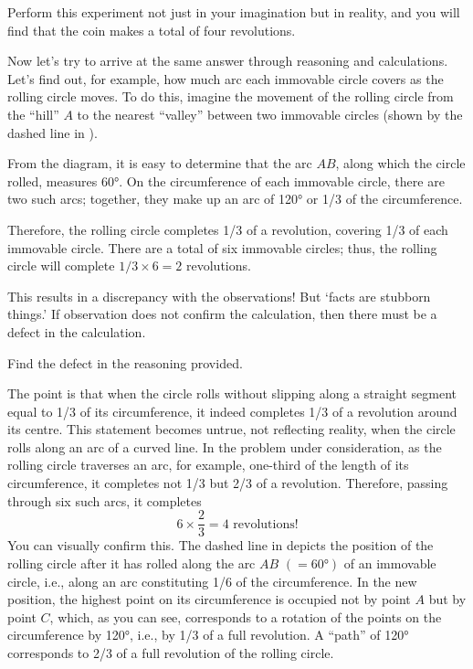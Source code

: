 Perform this experiment not just in your imagination but in reality, and you will find that the coin makes a total of four revolutions.

Now let's try to arrive at the same answer through reasoning and calculations. Let's find out, for example, how much arc each immovable circle covers as the rolling circle moves. To do this, imagine the movement of the rolling circle from the ``hill'' $A$ to the nearest ``valley'' between two immovable circles (shown by the dashed line in ).

From the diagram, it is easy to determine that the arc $AB$, along which the circle rolled, measures \ang{60}. On the circumference of each immovable circle, there are two such arcs; together, they make up an arc of \ang{120} or 1/3 of the circumference.

Therefore, the rolling circle completes 1/3 of a revolution, covering 1/3 of each immovable circle. There are a total of six immovable circles; thus, the rolling circle will complete $1/3 \times 6 = 2$ revolutions.

This results in a discrepancy with the observations! But `facts are stubborn things.' If observation does not confirm the calculation, then there must be a defect in the calculation.

Find the defect in the reasoning provided.

\ans  The point is that when the circle rolls without slipping along a straight segment equal to 1/3 of its circumference, it indeed completes 1/3 of a revolution around its centre. This statement becomes untrue, not reflecting reality, when the circle rolls along an arc of a curved line. In the problem under consideration, as the rolling circle traverses an arc, for example, one-third of the length of its circumference, it completes not 1/3 but 2/3 of a revolution. Therefore, passing through six such arcs, it completes
\begin{equation*}
6 \times \frac{2}{3} = 4\,\,\text{revolutions!}
\end{equation*}
You can visually confirm this. The dashed line in  depicts the position of the rolling circle after it has rolled along the arc $AB\,\, (=\ang{60})$ of an immovable circle, i.e., along an arc constituting 1/6 of the circumference. In the new position, the highest point on its circumference is occupied not by point $A$ but by point $C$, which, as you can see, corresponds to a rotation of the points on the circumference by \ang{120}, i.e., by 1/3 of a full revolution. A ``path'' of \ang{120} corresponds to 2/3 of a full revolution of the rolling circle.

